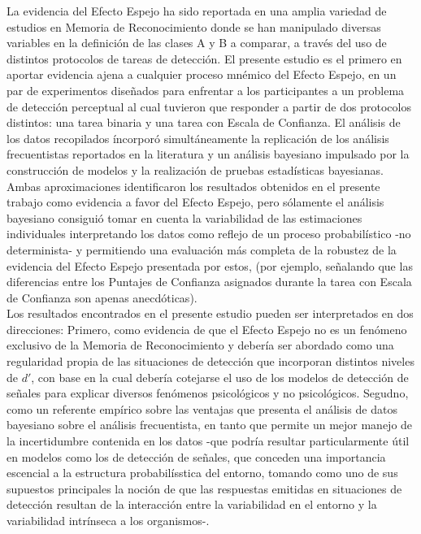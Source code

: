 La evidencia del Efecto Espejo ha sido reportada en una amplia variedad de estudios en Memoria de Reconocimiento donde se han manipulado diversas variables en la definición de las clases A y B a comparar, a través del uso de distintos protocolos de tareas de detección. El presente estudio es el primero en aportar evidencia ajena a cualquier proceso mnémico del Efecto Espejo, en un par de experimentos diseñados para enfrentar a los participantes a un problema de detección perceptual al cual tuvieron que responder a partir de dos protocolos distintos: una tarea binaria y una tarea con Escala de Confianza. El análisis de los datos recopilados íncorporó simultáneamente la replicación de los análisis frecuentistas reportados en la literatura y un análisis bayesiano impulsado por la construcción de modelos y la realización de pruebas estadísticas bayesianas. Ambas aproximaciones identificaron los resultados obtenidos en el presente trabajo como evidencia a favor del Efecto Espejo, pero sólamente el análisis bayesiano  consiguió tomar en cuenta la variabilidad de las estimaciones individuales interpretando los datos como reflejo de un proceso probabilístico -no determinista- y permitiendo una evaluación más completa de la robustez de la evidencia del Efecto Espejo presentada por estos, (por ejemplo, señalando que las diferencias entre los Puntajes de Confianza asignados durante la tarea con Escala de Confianza son apenas anecdóticas).\\

Los resultados encontrados en el presente estudio pueden ser interpretados en dos direcciones: Primero, como evidencia de que el Efecto Espejo no es un fenómeno exclusivo de la Memoria de Reconocimiento y debería ser abordado como una regularidad propia de las situaciones de detección que incorporan distintos niveles de $d'$, con base en la cual debería cotejarse el uso de los modelos de detección de señales para explicar diversos fenómenos psicológicos y no psicológicos. Segudno, como un referente empírico sobre las ventajas que presenta el análisis de datos bayesiano sobre el análisis frecuentista, en tanto que permite un mejor manejo de la incertidumbre contenida en los datos -que podría resultar particularmente útil en modelos como los de detección de señales, que conceden una importancia escencial a la estructura probabilísstica del entorno, tomando como uno de sus supuestos principales la noción de que las respuestas emitidas en situaciones de detección resultan de la interacción entre la variabilidad en el entorno y la variabilidad intrínseca a los organismos-.\\
